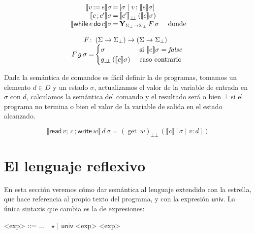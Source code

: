 \documentclass[a4paper,twoside,12pt]{article}
\newcommand{\falseD}{\mathit{false}}
\newcommand{\assign}{\mathop{:=}}
\newcommand{\seq}{\mathop{;}}
\newcommand{\whilec}{\mathsf{while}}
\newcommand{\doc}{\mathsf{do}}
\newcommand{\readV}{\mathsf{read}}
\newcommand{\writeV}{\mathsf{write}}
\newcommand{\sem}[2]{\llbracket #1 \rrbracket #2}
\newcommand{\upd}[3]{[#1 \mid #2 \colon #3]}
\newcommand{\semf}[1]{\llbracket #1 \rrbracket}
\newcommand{\liftFun}[1]{{#1}_{\bot\!\!\bot}}
\newcommand{\fixpoint}[2]{\mathbf{Y}_{#1}\,#2}
\newcommand{\getVar}[1]{\mathop{get}\, #1}
\begin{document}
\begin{definition}
  \[
  \array{r@{\,=\,}l@{\quad}l@{}}%
  \sem{v \assign e}{\sigma} & \upd{\sigma}{v}{\sem e \sigma} & {} \\
  \sem{c \seq c'}{\sigma} & \liftFun{\semf{c'}}\,(\sem c \sigma) & {} \\
  \sem{\whilec\, e\, \doc\, c}{\sigma} & \fixpoint{\Sigma_\bot \to \Sigma_\bot}{F}\,\sigma & \text{ donde } \\
  \endarray
  \]

  \[
  \array{r@{\,}l}%
  F \colon & (\Sigma \to \Sigma_\bot) \to (\Sigma \to \Sigma_\bot) \\
  F\,g\,\sigma = &
  \begin{cases}
    \sigma & \text{ si } \sem{e}{\sigma} = \falseD \\
    \liftFun{g}\,(\sem c \sigma) & \text{ caso contrario } 
  \end{cases}
  \endarray
  \]
\end{definition}

Dada la semántica de comandos es fácil definir la de programas, tomamos
un elemento $d \in D$ y un estado $\sigma$, actualizamos el valor de la
variable de entrada en $\sigma$ con $d$, calculamos la semántica del comando
y el resultado será o bien $\bot$ si el programa no termina o bien el valor
de la variable de salida en el estado alcanzado.
\begin{definition}
  \[
  \semf{\readV\, v\seq\, c\,\seq \writeV\, w}\, d\, \sigma = \liftFun{(\getVar{w})}\,(\sem{c}{\upd{\sigma}{v}{d}})
  \] 
\end{definition}

\section{El lenguaje reflexivo}
\label{sec:refl}

En esta sección veremos cómo dar semántica al lenguaje extendido
con la estrella, que hace referencia al propio texto del programa,
y con la expresión $\mathsf{univ}$. La única sintaxis que cambia
es la de expresiones:
\newcommand{\univ}{\mathsf{univ}}

\begin{definition}\hfill

  \begin{grammar}
    <exp> ::=  $\ldots$ | $\star$ | $\univ$ <exp> <exp>
  \end{grammar}
\end{definition}
\end{document}

